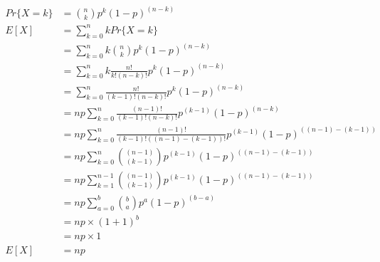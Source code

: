 \documentclass{article}
\begin{document}
	\begin{align}
	Pr\{X = k\} & = {n \choose k} p^k (1 - p)^{(n - k)} \\
	E[X] & = \sum_{k = 0}^{n} k Pr\{X = k\} \\
	& = \sum_{k = 0}^{n} k {n \choose k} p^k (1 - p)^{(n - k)} \\
	& = \sum_{k = 0}^{n} k \frac{n!}{k!(n - k)!} p^k (1 - p)^{(n - k)} \\
	& = \sum_{k = 0}^{n} \frac{n!}{(k - 1)!(n - k)!} p^k (1 - p)^{(n - k)} \\
	& = np \sum_{k = 0}^{n} \frac{(n - 1)!}{(k - 1)!(n - k)!} p^{(k - 1)} (1 - p)^{(n - k)} \\
	& = np \sum_{k = 0}^{n} \frac{(n - 1)!}{(k - 1)!((n - 1) - (k - 1))!} p^{(k - 1)} (1 - p)^{((n - 1) - (k - 1))} \\
	& = np \sum_{k = 0}^{n} {(n - 1) \choose (k - 1)} p^{(k - 1)} (1 - p)^{((n - 1) - (k - 1))} \\
	& = np \sum_{k = 1}^{n - 1} {(n - 1) \choose (k - 1)} p^{(k - 1)} (1 - p)^{((n - 1) - (k - 1))} \\
	& = np \sum_{a = 0}^{b} {b \choose a} p^{a} (1 - p)^{(b - a)} \\
	& = np \times (1 + 1)^b \\ 
	& = np \times 1 \\
	E[X] & = np
	\end{align}
\end{document}
